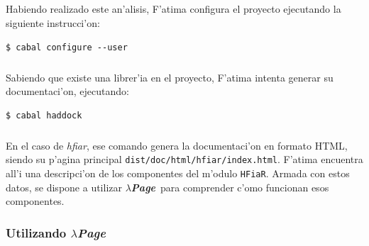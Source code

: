 \documentclass[a4paper]{article}
\newcommand{\hpage}{\textbf{\textsl{$\lambda$Page}}}
\begin{document}
\subparagraph{}Habiendo realizado este an'alisis, F'atima configura el proyecto ejecutando la siguiente instrucci'on:
\begin{center}\begin{lstlisting}
$ cabal configure --user
\end{lstlisting}\end{center}
\subparagraph{}Sabiendo que existe una librer'ia en el proyecto, F'atima intenta generar su documentaci'on, ejecutando:
\begin{center}\begin{lstlisting}
$ cabal haddock
\end{lstlisting}\end{center}
\subparagraph{}En el caso de \textsl{hfiar}, ese comando genera la documentaci'on en formato HTML, siendo su p'agina principal \texttt{dist/doc/html/hfiar/index.html}.  F'atima encuentra all'i una descripci'on de los componentes del m'odulo \texttt{HFiaR}.  Armada con estos datos, se dispone a utilizar \hpage\ para comprender c'omo funcionan esos componentes.

\newpage
\subsubsection{Utilizando \hpage}
\end{document}
